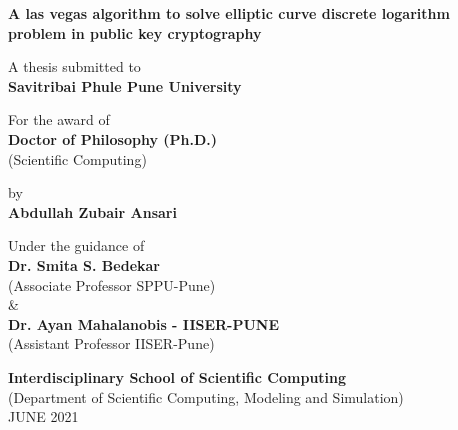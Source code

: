 \begin{titlepage}
    \begin{center}
            
        \Large
        \textbf{A las vegas algorithm to solve elliptic curve  discrete logarithm problem in public key cryptography}
            
        \vspace{0.5cm}
        \large

        \vspace{1.5cm}
        A thesis submitted to        \\
        \textbf{Savitribai Phule Pune University}

        \vspace{1.5cm}
        For the award of \\
        \textbf{Doctor of Philosophy (Ph.D.)}\\
        (Scientific Computing)

        \vspace{1.5cm}
        by  \\
        \large
        \textbf{Abdullah Zubair Ansari} 
        
        \vspace{0.8cm}
        
        \vspace{1.5cm}
        \large
        Under the guidance of  \\
        \vspace{0.3cm}
        \textbf{Dr. Smita S. Bedekar}\\
        \small
        (Associate Professor SPPU-Pune)\\
        \large
        \& \\     
        \textbf{Dr. Ayan Mahalanobis - IISER-PUNE}\\
         \small
        (Assistant Professor IISER-Pune)\\
        \vspace{1.5cm}

        \Large
        \textbf{Interdisciplinary School of Scientific Computing}\\
        \small 
        (Department of Scientific Computing, Modeling and Simulation) \\        
        \normalsize
        \vspace{0.5cm}         
        JUNE 2021
            
    \end{center}
\end{titlepage}
